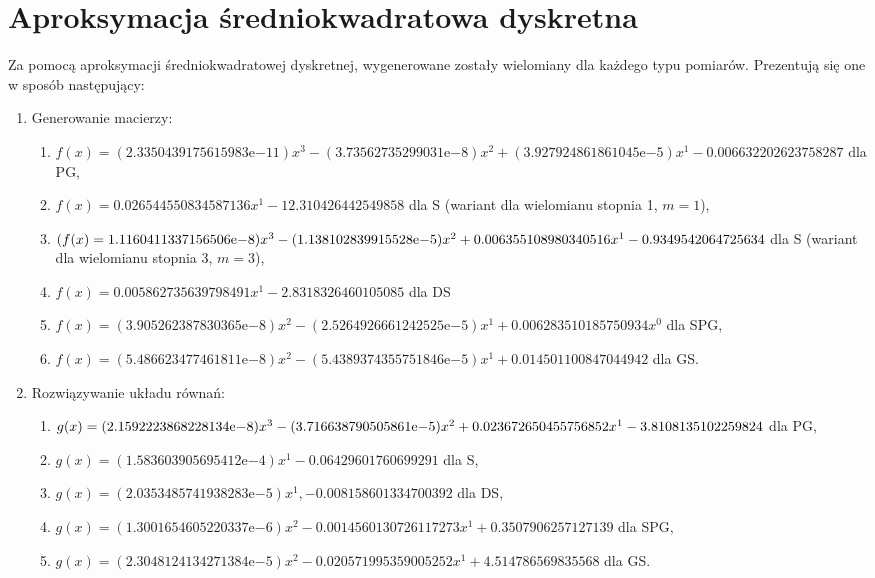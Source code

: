 \documentclass[10pt]{article}
\newcommand{\expnumber}[2]{{#1}\mathrm{e}{#2}}
\begin{document}
\section{Aproksymacja średniokwadratowa dyskretna}
Za pomocą aproksymacji średniokwadratowej dyskretnej, wygenerowane zostały wielomiany dla każdego typu pomiarów. Prezentują się one w sposób następujący:
\begin{enumerate}
	\item Generowanie macierzy:
	\begin{enumerate}
		\item $f(x)=(\expnumber{2.3350439175615983}{-11})x^3 -(\expnumber{3.73562735299031}{-8}) x^2 + (\expnumber{3.927924861861045}{-5}) x^1 -0.006632202623758287$ dla PG,
		\item $f(x)=0.026544550834587136 x^1 -12.310426442549858$ dla S (wariant dla wielomianu stopnia 1, $m=1$),
		\item $(f(x)=\expnumber{1.1160411337156506}{-8})x^3 - (\expnumber{1.138102839915528}{-5})x^2 + 0.006355108980340516 x^1 \\-0.9349542064725634$ dla S (wariant dla wielomianu stopnia 3, $m=3$),
		\item $f(x)=0.005862735639798491x^1 -2.8318326460105085$ dla DS
		\item $f(x)=(\expnumber{3.905262387830365}{-8})x^2 -(\expnumber{2.5264926661242525}{-5})x^1 + 0.006283510185750934 x^0$ dla SPG,
		\item $f(x)=(\expnumber{5.486623477461811}{-8})x^2 - (\expnumber{5.4389374355751846}{-5}) x^1 + 0.014501100847044942$ dla GS.
	\end{enumerate}
	\item Rozwiązywanie układu równań:
	\begin{enumerate}
		\item $g(x)=(\expnumber{2.1592223868228134}{-8})x^3 - (\expnumber{3.716638790505861}{-5})x^2 + 0.023672650455756852x^1 \\-3.8108135102259824$ dla PG,
		\item $g(x)=(\expnumber{1.583603905695412}{-4})x^1 -0.06429601760699291$ dla S,
		\item $g(x)=(\expnumber{2.0353485741938283}{-5}) x^1,-0.008158601334700392$ dla DS,
		\item $g(x)=(\expnumber{1.3001654605220337}{-6})x^2 - 0.0014560130726117273x^1 + 0.3507906257127139$ dla SPG,
		\item $g(x)=(\expnumber{2.3048124134271384}{-5})x^2 - 0.020571995359005252x^1 + 4.514786569835568$ dla GS.
	\end{enumerate}
\end{enumerate}
\end{document}
